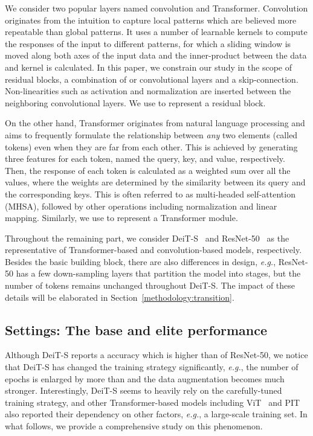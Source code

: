 \documentclass[10pt,twocolumn,letterpaper]{article}
\begin{document}
We consider two popular layers named convolution and Transformer. Convolution originates from the intuition to capture local patterns which are believed more repeatable than global patterns. It uses a number of learnable kernels to compute the responses of the input to different patterns, for which a sliding window is moved along both axes of the input data and the inner-product between the data and kernel is calculated. In this paper, we constrain our study in the scope of residual blocks, a combination of  or  convolutional layers and a skip-connection. Non-linearities such as activation and normalization are inserted between the neighboring convolutional layers. We use  to represent a residual block.

On the other hand, Transformer originates from natural language processing and aims to frequently formulate the relationship between \textit{any} two elements (called tokens) even when they are far from each other. This is achieved by generating three features for each token, named the query, key, and value, respectively. Then, the response of each token is calculated as a weighted sum over all the values, where the weights are determined by the similarity between its query and the corresponding keys. This is often referred to as multi-headed self-attention (MHSA), followed by other operations including normalization and linear mapping. Similarly, we use  to represent a Transformer module.

Throughout the remaining part, we consider DeiT-S~\cite{touvron2020training} and ResNet-50~\cite{he2016deep} as the representative of Transformer-based and convolution-based models, respectively. Besides the basic building block, there are also differences in design, \textit{e.g.}, ResNet-50 has a few down-sampling layers that partition the model into stages, but the number of tokens remains unchanged throughout DeiT-S. The impact of these details will be elaborated in Section~\ref{methodology:transition}.

\subsection{Settings: The base and elite performance}
\label{methodology:settings}

Although DeiT-S reports a  accuracy which is higher than  of ResNet-50, we notice that DeiT-S has changed the training strategy significantly, \textit{e.g.}, the number of epochs is enlarged by more than  and the data augmentation becomes much stronger. Interestingly, DeiT-S seems to heavily rely on the carefully-tuned training strategy, and other Transformer-based models including ViT~\cite{dosovitskiy2020image} and PIT~\cite{chen2020pre} also reported their dependency on other factors, \textit{e.g.}, a large-scale training set. In what follows, we provide a comprehensive study on this phenomenon.
\end{document}
